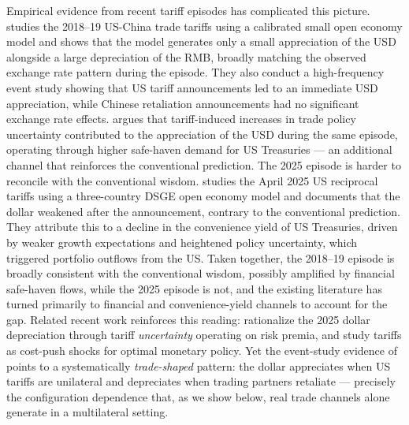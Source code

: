 \documentclass[11pt]{article}
\theoremstyle{plain}
\theoremstyle{remark}
\numberwithin{lemma}{section}
\numberwithin{proposition}{section}
\numberwithin{corollary}{section}
\newcommand{\rev}[1]{{\color{RevBlue}#1}}
\begin{document}
Empirical evidence from recent tariff episodes has complicated this picture. \cite{jeanne2024extent} studies the 2018--19 US-China trade tariffs using a calibrated small open economy model and shows that the model generates only a small appreciation of the USD alongside a large depreciation of the RMB, broadly matching the observed exchange rate pattern during the episode. They also conduct a high-frequency event study showing that US tariff announcements led to an immediate USD appreciation, while Chinese retaliation announcements had no significant exchange rate effects. \cite{khalil2024us} argues that tariff-induced increases in trade policy uncertainty contributed to the appreciation of the USD during the same episode, operating through higher safe-haven demand for US Treasuries — an additional channel that reinforces the conventional prediction. The 2025 episode is harder to reconcile with the conventional wisdom. \cite{cardani2025exchange} studies the April 2025 US reciprocal tariffs using a three-country DSGE open economy model and documents that the dollar weakened after the announcement, contrary to the conventional prediction. They attribute this to a decline in the convenience yield of US Treasuries, driven by weaker growth expectations and heightened policy uncertainty, which triggered portfolio outflows from the US. Taken together, the 2018--19 episode is broadly consistent with the conventional wisdom, possibly amplified by financial safe-haven flows, while the 2025 episode is not, and the existing literature has turned primarily to financial and convenience-yield channels to account for the gap. \rev{Related recent work reinforces this reading: \cite{kalemli2025} rationalize the 2025 dollar depreciation through tariff \emph{uncertainty} operating on risk premia, and \cite{werning2025} study tariffs as cost-push shocks for optimal monetary policy. Yet the event-study evidence of \cite{corsetti2025} points to a systematically \emph{trade-shaped} pattern: the dollar appreciates when US tariffs are unilateral and depreciates when trading partners retaliate --- precisely the configuration dependence that, as we show below, real trade channels alone generate in a multilateral setting.}
\end{document}
